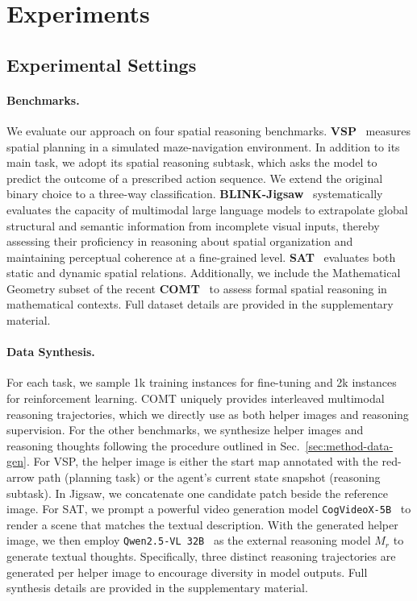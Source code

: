 \section{Experiments}
\label{sec:exp}

\subsection{Experimental Settings}
\label{sec:exp-settings}

\paragraph{Benchmarks.}
We evaluate our approach on four spatial reasoning benchmarks. \textbf{VSP}~\citep{wu2024vsp} measures spatial planning in a simulated maze-navigation environment. In addition to its main task, we adopt its spatial reasoning subtask, which asks the model to predict the outcome of a prescribed action sequence. We extend the original binary choice to a three-way classification. 
\textbf{BLINK-Jigsaw}~\citep{fu2024blink} systematically evaluates the capacity of multimodal large language models to extrapolate global structural and semantic information from incomplete visual inputs, thereby assessing their proficiency in reasoning about spatial organization and maintaining perceptual coherence at a fine-grained level. \textbf{SAT}~\citep{ray2024sat} evaluates both static and dynamic spatial relations.
Additionally, we include the Mathematical Geometry subset of the recent \textbf{COMT}~\citep{cheng2025comt} to assess formal spatial reasoning in mathematical contexts.
Full dataset details are provided in the supplementary material.

\paragraph{Data Synthesis.}
For each task, we sample 1k training instances for fine-tuning and 2k instances for reinforcement learning. 
COMT uniquely provides interleaved multimodal reasoning trajectories, which we directly use as both helper images and reasoning supervision. For the other benchmarks, we synthesize helper images and reasoning thoughts following the procedure outlined in Sec.~\ref{sec:method-data-gen}.
For VSP, the helper image is either the start map annotated with the red-arrow path (planning task) or the agent's current state snapshot (reasoning subtask). In Jigsaw, we concatenate one candidate patch beside the reference image. For SAT, we prompt a powerful video generation model \texttt{CogVideoX-5B}~\citep{yang2024cogvideox} to render a scene that matches the textual description. With the generated helper image, we then employ \texttt{Qwen2.5-VL 32B}~\citep{bai2025qwen2} as the external reasoning model $M_r$ to generate textual thoughts. Specifically, three distinct reasoning trajectories are generated per helper image to encourage diversity in model outputs. Full synthesis details are provided in the supplementary material.

